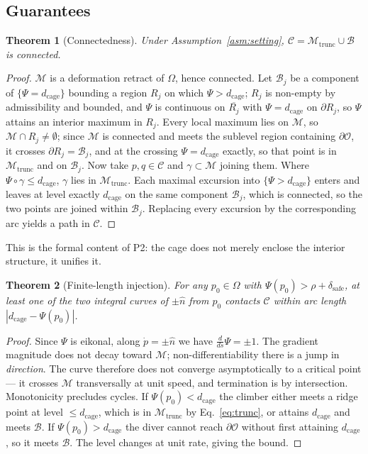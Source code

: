 \documentclass[conference]{IEEEtran}
\newtheorem{theorem}{Theorem}
\begin{document}
\subsection{Guarantees}

\begin{theorem}[Connectedness]
\label{thm:connected}
Under Assumption~\ref{asm:setting}, $\mathcal{C}=\mathcal{M}_{\mathrm{trunc}}\cup\mathcal{B}$ is connected.
\end{theorem}
\begin{proof}
$\mathcal{M}$ is a deformation retract of $\Omega$, hence connected. Let $\mathcal{B}_j$ be a component of $\{\Psi=d_{\mathrm{cage}}\}$ bounding a region $R_j$ on which $\Psi>d_{\mathrm{cage}}$; $R_j$ is non-empty by admissibility and bounded, and $\Psi$ is continuous on $\overline{R_j}$ with $\Psi=d_{\mathrm{cage}}$ on $\partial R_j$, so $\Psi$ attains an interior maximum in $R_j$. Every local maximum lies on $\mathcal{M}$, so $\mathcal{M}\cap R_j\neq\emptyset$; since $\mathcal{M}$ is connected and meets the sublevel region containing $\partial\mathcal{O}$, it crosses $\partial R_j=\mathcal{B}_j$, and at the crossing $\Psi=d_{\mathrm{cage}}$ exactly, so that point is in $\mathcal{M}_{\mathrm{trunc}}$ and on $\mathcal{B}_j$. Now take $p,q\in\mathcal{C}$ and $\gamma\subset\mathcal{M}$ joining them. Where $\Psi\circ\gamma\le d_{\mathrm{cage}}$, $\gamma$ lies in $\mathcal{M}_{\mathrm{trunc}}$. Each maximal excursion into $\{\Psi>d_{\mathrm{cage}}\}$ enters and leaves at level exactly $d_{\mathrm{cage}}$ on the same component $\mathcal{B}_j$, which is connected, so the two points are joined within $\mathcal{B}_j$. Replacing every excursion by the corresponding arc yields a path in $\mathcal{C}$.
\end{proof}

This is the formal content of P2: the cage does not merely enclose the interior structure, it unifies it.

\begin{theorem}[Finite-length injection]
\label{thm:injection}
For any $p_0\in\Omega$ with $\Psi(p_0)>\rho+\delta_{\mathrm{safe}}$, at least one of the two integral curves of $\pm\hat{n}$ from $p_0$ contacts $\mathcal{C}$ within arc length $|d_{\mathrm{cage}}-\Psi(p_0)|$.
\end{theorem}
\begin{proof}
Since $\Psi$ is eikonal, along $\dot{p}=\pm\hat{n}$ we have $\tfrac{d}{ds}\Psi=\pm 1$. The gradient magnitude does not decay toward $\mathcal{M}$; non-differentiability there is a jump in \emph{direction}. The curve therefore does not converge asymptotically to a critical point --- it crosses $\mathcal{M}$ transversally at unit speed, and termination is by intersection. Monotonicity precludes cycles. If $\Psi(p_0)<d_{\mathrm{cage}}$ the climber either meets a ridge point at level $\le d_{\mathrm{cage}}$, which is in $\mathcal{M}_{\mathrm{trunc}}$ by Eq.~\eqref{eq:trunc}, or attains $d_{\mathrm{cage}}$ and meets $\mathcal{B}$. If $\Psi(p_0)>d_{\mathrm{cage}}$ the diver cannot reach $\partial\mathcal{O}$ without first attaining $d_{\mathrm{cage}}$, so it meets $\mathcal{B}$. The level changes at unit rate, giving the bound.
\end{proof}
\end{document}
